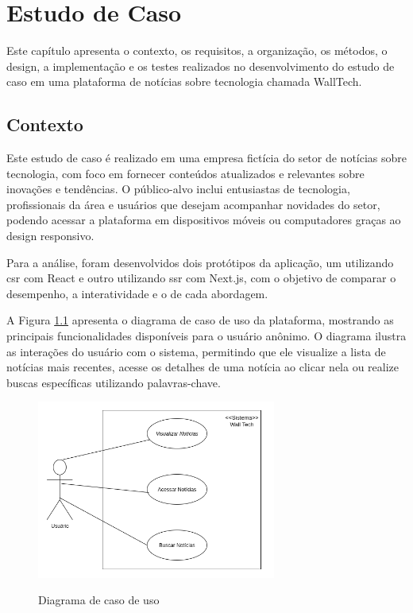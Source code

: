 \chapter{Estudo de Caso }
\label{cap:estudo_caso}
Este capítulo apresenta o contexto, os requisitos, a organização, os métodos, o design, a implementação e os testes realizados no desenvolvimento do estudo de caso em uma plataforma de notícias sobre tecnologia chamada WallTech.

\section{Contexto}
\label{section:contexto}
Este estudo de caso é realizado em uma empresa fictícia do setor de notícias sobre tecnologia, com foco em fornecer conteúdos atualizados e relevantes sobre inovações e tendências. O público-alvo inclui entusiastas de tecnologia, profissionais da área e usuários que desejam acompanhar novidades do setor, podendo acessar a plataforma em dispositivos móveis ou computadores graças ao design responsivo.

Para a análise, foram desenvolvidos dois protótipos da aplicação, um utilizando \acrfull{csr} com React e outro utilizando \acrfull{ssr} com Next.js, com o objetivo de comparar o desempenho, a interatividade e o  de cada abordagem.

A Figura \ref{fig:caso-uso-walltech} apresenta o diagrama de caso de uso da plataforma, mostrando as principais funcionalidades disponíveis para o usuário anônimo. O diagrama ilustra as interações do usuário com o sistema, permitindo que ele visualize a lista de notícias mais recentes, acesse os detalhes de uma notícia ao clicar nela ou realize buscas específicas utilizando palavras-chave.  

\begin{figure}[H]
  \centering
  \caption{Diagrama de caso de uso}
  \includegraphics[width=0.7\textwidth]{media/wall_tech_use_case.png}
  \label{fig:caso-uso-walltech}
\end{figure}



